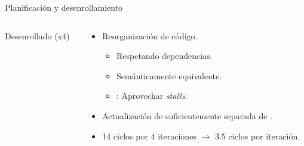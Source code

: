 \begin{frame}[t]{Planificación y desenrollamiento}

\begin{columns}

\begin{column}{.45\textwidth}
\begin{block}{Desenrollado (x4)}

\end{block}
\end{column}

\begin{column}{.45\textwidth}
\begin{itemize}
  \item Reorganización de código.
    \begin{itemize}
      \item Respetando dependencias.
      \item Semánticamente equivalente.
      \item {}: Aprovechar \emph{stalls}.
    \end{itemize}
  \item Actualización de  suficientemente separada de
        .
  \item 14 ciclos por 4 iteraciones $\rightarrow$ $3.5$ ciclos por iteración.
\end{itemize}
\end{column}

\end{columns}

\end{frame}

